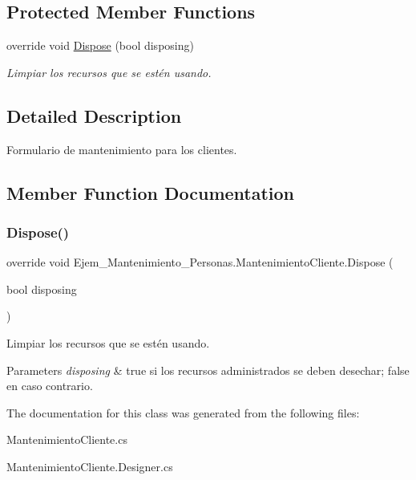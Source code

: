 \subsection*{Protected Member Functions}
\begin{DoxyCompactItemize}
\item 
override void \mbox{\hyperlink{class_ejem___mantenimiento___personas_1_1_mantenimiento_cliente_a7da653fc99f1760106123912d66f5a5d}{Dispose}} (bool disposing)
\begin{DoxyCompactList}\small\item\em Limpiar los recursos que se estén usando. \end{DoxyCompactList}\end{DoxyCompactItemize}


\subsection{Detailed Description}
Formulario de mantenimiento para los clientes. 



\subsection{Member Function Documentation}
\mbox{\label{class_ejem___mantenimiento___personas_1_1_mantenimiento_cliente_a7da653fc99f1760106123912d66f5a5d}} 
\subsubsection{\texorpdfstring{Dispose()}{Dispose()}}
{\footnotesize\ttfamily override void Ejem\+\_\+\+Mantenimiento\+\_\+\+Personas.\+Mantenimiento\+Cliente.\+Dispose (\begin{DoxyParamCaption}\item[{bool}]{disposing }\end{DoxyParamCaption})\hspace{0.3cm}{\ttfamily [protected]}}



Limpiar los recursos que se estén usando. 


\begin{DoxyParams}{Parameters}
{\em disposing} & true si los recursos administrados se deben desechar; false en caso contrario.\\
\hline
\end{DoxyParams}


The documentation for this class was generated from the following files\+:\begin{DoxyCompactItemize}
\item 
Mantenimiento\+Cliente.\+cs\item 
Mantenimiento\+Cliente.\+Designer.\+cs\end{DoxyCompactItemize}
